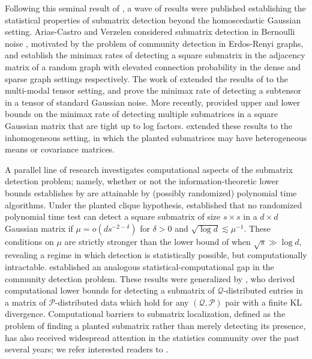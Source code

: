 \documentclass{article}
\theoremstyle{remark}
\begin{document}
Following this seminal result of \cite{butucea2013detection}, a wave of results were published establishing the statistical properties of submatrix detection beyond the homoscedastic Gaussian setting. Arias-Castro and Verzelen considered submatrix detection in Bernoulli noise \citep{arias2014community, verzelen2015community}, motivated by the problem of community detection in Erdos-Renyi graphs, and establish the minimax rates of detecting a square submatrix in the adjacency matrix of a random graph with elevated connection probability in the dense \citep{arias2014community} and sparse \citep{verzelen2015community} graph settings respectively. The work of \citet{luo2022tensor} extended the results of \citet{butucea2013detection} to the multi-modal tensor setting, and prove the minimax rate of detecting a subtensor in a tensor of standard Gaussian noise.  More recently, \citet{dadon2024detection} provided upper and lower bounds on the minimax rate of detecting multiple submatrices in a square Gaussian matrix that are tight up to log factors. \citet{oren2026inhomogeneous} extended these results to the inhomogeneous setting, in which the planted submatrices may have heterogeneous means or covariance matrices.

A parallel line of research investigates computational aspects of the submatrix detection problem; namely, whether or not the information-theoretic lower bounds establishes by \citet{butucea2013detection} are attainable by (possibly randomized) polynomial time algorithms. Under the planted clique hypothesis, \citet{ma2015computational} established that no randomized polynomial time test can detect a square submatrix of size $s \times s$ in a $d \times d$ Gaussian matrix if $\mu = o(d s^{-2 - \delta})$ for $\delta > 0$ and $\sqrt{\log d} \lesssim \mu^{-1}$. These conditions on $\mu$ are strictly stronger than the lower bound of \citet{butucea2013detection} when $\sqrt{s} \gg \log d$, revealing a regime in which detection is statistically possible, but computationally intractable. \citet{hajek2015computational} established an analogous statistical-computational gap in the community detection problem. These results were generalized by \citet{brennan2019universality}, who derived computational lower bounds for detecting a submatrix of $\mathcal{Q}$-distributed entries in a matrix of $\mathcal{P}$-distributed data which hold for any $(\mathcal{Q}, \mathcal{P})$ pair with a finite KL divergence. Computational barriers to submatrix localization, defined as the problem of finding a planted submatrix rather than merely detecting its presence, has also received widespread attention in the statistics community over the past several years; we refer interested readers to \citet{balakrishnan2011statistical, chen2016statistical, cai2017computational, hajek2017information, hajek2018submatrix, hajek2016semidefinite}.
\end{document}
